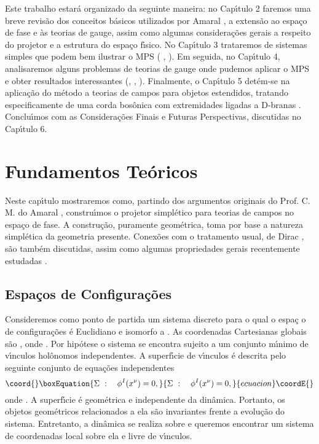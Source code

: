 \documentclass[a4paper,thmsa,12pt]{report}
\begin{document}
Este trabalho estar\'{a} organizado da seguinte maneira: no Cap\'{\i}tulo 2
faremos uma breve revis\~{a}o dos conceitos b\'{a}sicos utilizados por
Amaral \cite{cma}, a extens\~{a}o ao espa\c{c}o de fase e \`{a}s teorias de
gauge, assim como algumas considera\c{c}\~{o}es gerais a respeito do
projetor e a estrutura do espa\c{c}o f\'{\i}sico. No Cap\'{\i}tulo 3
trataremos de sistemas simples que podem bem ilustrar o MPS (\cite{c-lee} , 
\cite{revmmi}). Em seguida, no Cap\'{\i}tulo 4, analisaremos alguns problemas
de teorias de gauge onde pudemos aplicar o MPS e obter resultados
interessantes (\cite{qed}, \cite{helayel}, \cite{alvaro}). Finalmente, o
Cap\'{\i}tulo 5 det\'{e}m-se na aplica\c{c}\~{a}o do m\'{e}todo a teorias de
campos para objetos estendidos, tratando especificamente de uma corda
bos\^{o}nica com extremidades ligadas a D-branas \cite{mmi}. Conclu\'{\i}mos
com as Considera\c{c}\~{o}es Finais e Futuras Perspectivas, discutidas no
Cap\'{\i}tulo 6.

\chapter{{\sc Fundamentos Te\'oricos}}

Neste cap\'{\i}tulo mostraremos como, partindo dos argumentos originais do
Prof. C. M. do Amaral \cite{cma}, constru\'{\i}mos o projetor simpl\'{e}tico
para teorias de campos no espa\c{c}o de fase. A constru\c{c}\~{a}o,
puramente geom\'{e}trica, toma por base a natureza simpl\'{e}tica da
geometria presente. Conex\~{o}es com o tratamento usual, de Dirac \cite
{dirac}, s\~{a}o tamb\'{e}m discutidas, assim como algumas propriedades
gerais recentemente estudadas \cite{revmmi}.

\section{{\sc Espa\c cos de Configura\c c\~oes}}

Consideremos como ponto de partida um sistema discreto para o qual o espa\c{c%
}o de configura\c{c}\~{o}es \coordHE{} \'{e} Euclidiano e isomorfo a \coordHE{}.
As coordenadas Cartesianas globais s\~{a}o \coordHE{}, onde \coordHE{}. Por hip\'{o}tese o sistema se encontra sujeito a um conjunto
m\'{\i}nimo de \coordHE{} v\'{\i}nculos hol\^{o}nomos independentes. A
superf\'{\i}cie de v\'{\i}nculos \'{e} descrita pelo seguinte conjunto de
equa\c{c}\~{o}es independentes 
\begin{equation}\coord{}\boxEquation{
\Sigma ~:~~~\phi ^{I}(x^{\nu })=0,  \label{1}
}{
\Sigma ~:~~~\phi ^{I}(x^{\nu })=0,  }{ecuacion}\coordE{}\end{equation}
onde \coordHE{}. A superf\'{\i}cie \myHighlight{$\Sigma $}\coordHE{} \'{e} geom\'{e}trica e
independente da din\^{a}mica. Portanto, os objetos geom\'{e}tricos
relacionados a ela s\~{a}o invariantes frente a evolu\c{c}\~{a}o do sistema.
Entretanto, a din\^{a}mica se realiza sobre \myHighlight{$\Sigma $}\coordHE{} e queremos encontrar
um sistema de coordenadas local sobre ela e livre de v\'{\i}nculos.
\end{document}
